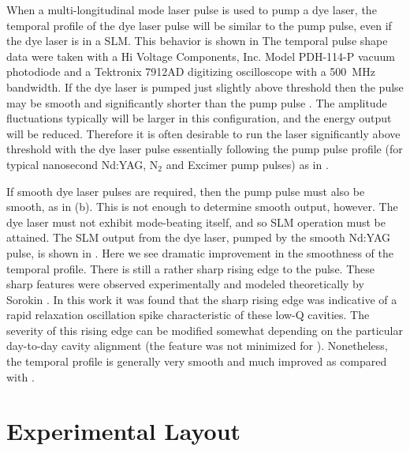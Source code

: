 When a multi-longitudinal mode laser pulse is used to pump a dye laser,
the temporal profile of the dye laser pulse will be similar to the pump pulse,
even if the dye laser is in a SLM.  This behavior is shown in 
The temporal pulse shape data were taken with a Hi Voltage Components, Inc.
 Model PDH-114-P vacuum photodiode and a Tektronix 7912AD digitizing oscilloscope
with a 500~MHz bandwidth.  If the dye laser is pumped just slightly above
threshold then the pulse may be smooth and significantly shorter than the pump
pulse \cite{Lin:75}.  The amplitude fluctuations typically will be larger in
this configuration, and the energy output will be reduced.  Therefore it is
often desirable to run the laser significantly above threshold with the dye
laser pulse essentially following the pump pulse profile (for typical nanosecond
Nd:YAG, N$_2$ and Excimer pump pulses) as in .

\begin{figure}[tb]
\bigskip
{}
\end{figure}

If smooth dye laser pulses are required, then the pump pulse must also be
smooth, as in (b).  This is not enough to determine smooth
output, however.  The dye laser must not exhibit mode-beating itself, and so SLM
operation must be attained.  The SLM output from the dye laser, pumped by the
smooth Nd:YAG pulse, is shown in .  Here we see dramatic
improvement in the smoothness of the temporal profile.  There is still a
rather sharp rising edge to the pulse. These sharp features were observed
experimentally and modeled theoretically by Sorokin \etal
\cite{Sorokin:67}. In this work it was found that the sharp rising edge was
indicative of a rapid relaxation oscillation spike characteristic of these
low-Q cavities.  The severity of this rising edge can be modified
somewhat depending on the particular day-to-day cavity alignment
(the feature was not minimized for ).  Nonetheless, the temporal
profile is generally very smooth and much improved as compared with
.

\section{Experimental Layout}

